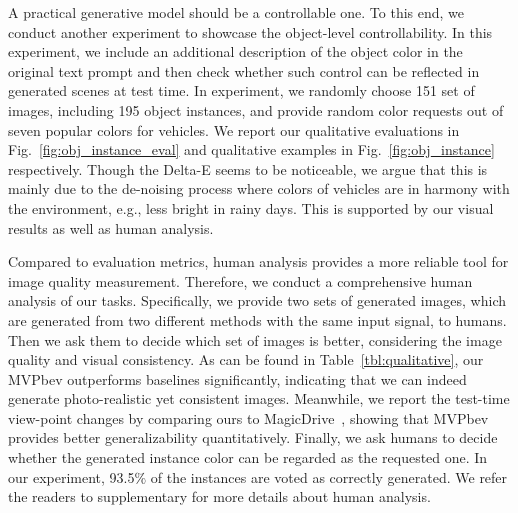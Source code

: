  A practical generative model should be a controllable one. To this end, we conduct another experiment to showcase the object-level controllability. In this experiment, we include an additional description of the object color in the original text prompt and then check whether such control can be reflected in generated scenes at test time. In experiment, we randomly choose 151 set of images, including 195 object instances, and provide random color requests out of seven popular colors for vehicles.
We report our qualitative evaluations in Fig.~\ref{fig:obj_instance_eval} and qualitative examples in Fig.~\ref{fig:obj_instance} respectively. Though the Delta-E seems to be noticeable, we argue that this is mainly due to the de-noising process where colors of vehicles are in harmony with the environment, e.g., less bright in rainy days. This is supported by our visual results as well as human analysis. 

Compared to evaluation metrics, human analysis provides a more reliable tool for image quality measurement. Therefore, we conduct a comprehensive human analysis of our tasks. Specifically, we provide two sets of generated images, which are generated from two different methods with the same input signal, to humans. Then we ask them to decide which set of images is better, considering the image quality and visual consistency. %
As can be found in Table~\ref{tbl:qualitative}, our MVPbev outperforms baselines significantly, indicating that we can indeed generate photo-realistic yet consistent images. Meanwhile, we report the test-time view-point changes by comparing ours to MagicDrive~\cite{gao2023magicdrive}, showing that MVPbev provides better generalizability quantitatively. Finally, we ask humans to decide whether the generated instance color can be regarded as the requested one. In our experiment, 93.5$\%$ of the instances are voted as correctly generated. We refer the readers to supplementary for more details about human analysis.

